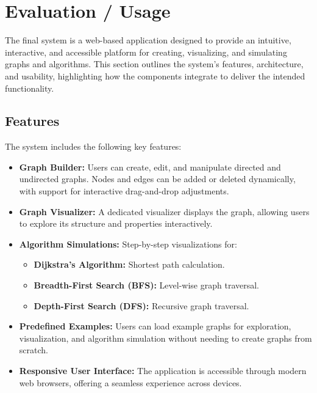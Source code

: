 \section{Evaluation / Usage}
\label{sec:evaluation}

The final system is a web-based application designed to provide an intuitive, interactive, and accessible platform for creating, visualizing, and simulating graphs and algorithms. This section outlines the system’s features, architecture, and usability, highlighting how the components integrate to deliver the intended functionality.

\subsection{Features}
The system includes the following key features:
\begin{itemize}
    \item \textbf{Graph Builder:} Users can create, edit, and manipulate directed and undirected graphs. Nodes and edges can be added or deleted dynamically, with support for interactive drag-and-drop adjustments.
    \item \textbf{Graph Visualizer:} A dedicated visualizer displays the graph, allowing users to explore its structure and properties interactively.
    \item \textbf{Algorithm Simulations:} Step-by-step visualizations for:
    \begin{itemize}
        \item \textbf{Dijkstra's Algorithm:} Shortest path calculation.
        \item \textbf{Breadth-First Search (BFS):} Level-wise graph traversal.
        \item \textbf{Depth-First Search (DFS):} Recursive graph traversal.
    \end{itemize}
    \item \textbf{Predefined Examples:} Users can load example graphs for exploration, visualization, and algorithm simulation without needing to create graphs from scratch.
    \item \textbf{Responsive User Interface:} The application is accessible through modern web browsers, offering a seamless experience across devices.
\end{itemize}

